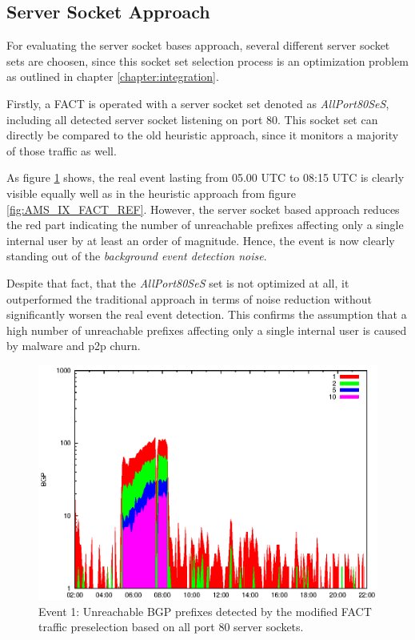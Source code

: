 \subsection{Server Socket Approach}
For evaluating the server socket bases approach, several different server socket sets are choosen, since this socket set selection process is an optimization problem as outlined in chapter \ref{chapter:integration}.

Firstly, a FACT is operated with a server socket set denoted as \emph{AllPort80SeS}, including all detected server socket listening on port 80. This socket set can directly be compared to the old heuristic approach, since it monitors a majority of those traffic as well. 

As figure \ref{fig:AMS_IX_FACT_allSES80} shows, the real event lasting from 05.00 UTC to 08:15 UTC is clearly visible equally well as in the heuristic approach from figure \ref{fig:AMS_IX_FACT_REF}. However, the server socket based approach reduces the red part indicating the number of unreachable prefixes affecting only a single internal user by at least an order of magnitude. Hence,  the event is now clearly standing out of the \emph{background event detection noise}.

Despite that fact, that the \emph{AllPort80SeS} set is not optimized at all, it outperformed the traditional approach in terms of noise reduction without significantly worsen the real event detection. This confirms the assumption that a high number of unreachable prefixes affecting only a single internal user is caused by malware and p2p churn.


\begin{figure}
	[p] \centering 
	\includegraphics[width=0.75\linewidth]{images/events/2010_03_25/bgp_log_allPort80SES.eps}
	\caption{Event 1: Unreachable BGP prefixes detected by the modified FACT traffic preselection based on all port 80 server sockets.} 
	\label{fig:AMS_IX_FACT_allSES80} 
\end{figure}


